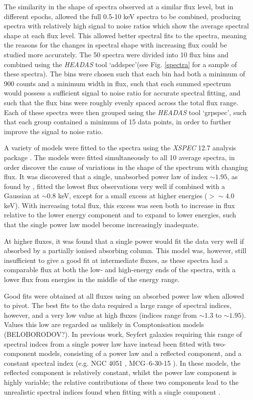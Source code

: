 \documentclass[letters,useAMS,usenatbib]{samnote}
\begin{document}
The similarity in the shape of spectra observed at a similar flux level, but in different epochs, allowed the full 0.5-10 keV spectra to be combined, producing spectra
with relatively high signal to noise ratios which show the average spectral shape at each flux level. This allowed better spectral fits to the spectra, meaning the
reasons for the changes in spectral shape with increasing flux could be studied more accurately. The 50 spectra were divided into 10 flux bins and combined using the
{\it HEADAS} tool `addspec'(see Fig. \ref{spectra} for a sample of these spectra). The bins were chosen such that each bin had both a minimum of 900 counts and a minimum
width in flux, such that each summed spectrum would possess a sufficient signal to noise ratio for accurate spectral fitting, and such that the flux bins were
roughly evenly spaced across the total flux range. Each of these spectra were then grouped using the {\it HEADAS} tool `grpspec', such that each group contained a minimum
of 15 data points, in order to further improve the signal to noise ratio.

A variety of models were fitted to the spectra using the {\it XSPEC} 12.7 analysis package \citet{arnaud}. The models were fitted simultaneously to all 10 average
spectra, in order discover the cause of variations in the shape of the spectrum with changing flux.  It was discovered that a single, unabsorbed power law of index $\sim
1.95$, as found by \citet{risaliti13}, fitted the lowest flux observations very well if combined with a Gaussian at $\sim 0.8$ keV, except for a small excess at higher
energies ($> \sim 4.0$ keV). With increasing total flux, this excess was seen both to increase in flux relative to the lower energy component and to expand to lower
energies, such that the single power law model become increasingly inadequate. 

At higher fluxes, it was found that a single power would fit the data very well if absorbed by a partially ionised absorbing column. This model was, however, still
insufficient to give a good fit at intermediate fluxes, as these spectra had a comparable flux at both the low- and high-energy ends of the spectra, with a lower flux
from energies in the middle of the energy range.

Good fits were obtained at all fluxes using an absorbed power law when allowed to pivot. The best fits to the data required a large range of spectral indices, however,
and a very low value at high fluxes (indices range from $\sim 1.3$ to $\sim 1.95$). Values this low are regarded as unlikely in Comptonisation models \citep{ponti}
(BELOBORODOV?). In previous work, Seyfert galaxies requiring this range of spectral indces from a single power law have instead been fitted with two-component models,
consisting of a power law and a reflected component, and a constant spectral index (e.g. NGC 4051 \citep{ponti}, MCG–6-30-15 \citep{fabian03}). In these models, the
reflected component is relatively constant, whilst the power law component is highly variable; the relative contributions of these two components lead to the
unrealistic spectral indices found when fitting with a single component \citep{papadakis}.
\end{document}
